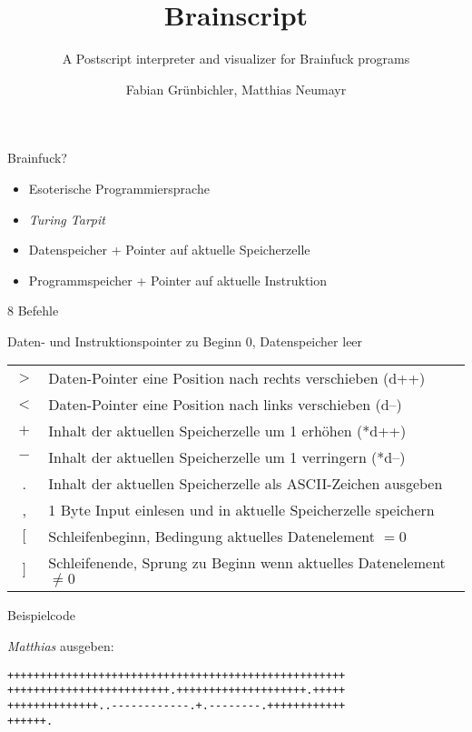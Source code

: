 \documentclass{beamer}
\title[Brainscript]{Brainscript}
\subtitle{A Postscript interpreter and visualizer for Brainfuck programs}
\author{Fabian Grünbichler, Matthias Neumayr}
\begin{document}
\frame{
    \titlepage
}


\begin{frame}{Brainfuck?}

    \begin{itemize}
        \item Esoterische Programmiersprache
        \item \emph{Turing Tarpit}
        \item Datenspeicher + Pointer auf aktuelle Speicherzelle
        \item Programmspeicher + Pointer auf aktuelle Instruktion
    \end{itemize}

\end{frame}

\begin{frame}{8 Befehle}

    \begin{center}
        Daten- und Instruktionspointer zu Beginn $0$, Datenspeicher leer\\ 
        \begin{table}
            \begin{tabular}[h!]{c|l}
                $>$ & Daten-Pointer eine Position nach rechts verschieben (d++) \\ 
                $<$ & Daten-Pointer eine Position nach links verschieben (d--) \\
                $+$ & Inhalt der aktuellen Speicherzelle um 1 erhöhen (*d++) \\
                $-$ & Inhalt der aktuellen Speicherzelle um 1 verringern (*d--) \\
                . & Inhalt der aktuellen Speicherzelle als ASCII-Zeichen ausgeben \\
                , & 1 Byte Input einlesen und in aktuelle Speicherzelle speichern \\
                $[$ & Schleifenbeginn, Bedingung aktuelles Datenelement  $= 0$ \\
                $]$ & Schleifenende, Sprung zu Beginn wenn aktuelles Datenelement $\neq 0$ \\
            \end{tabular}
        \end{table}
    \end{center}

\end{frame}

\begin{frame}[fragile,c]{Beispielcode}

    \emph{Matthias} ausgeben:

    \begin{verbatim}
++++++++++++++++++++++++++++++++++++++++++++++++++++
+++++++++++++++++++++++++.++++++++++++++++++++.+++++
++++++++++++++..------------.+.--------.++++++++++++
++++++.
    \end{verbatim}

\end{frame}
\end{document}
